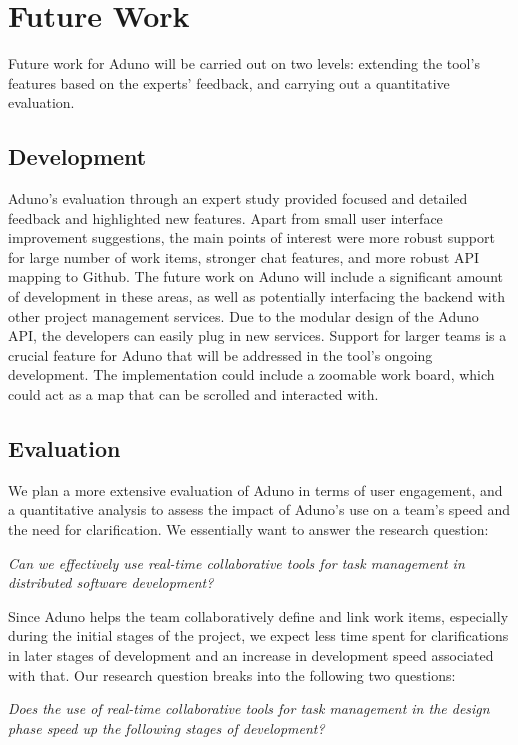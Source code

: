 \documentclass[conference]{IEEEtran}
\begin{document}
\section{Future Work}
\label{sec:future}

Future work for Aduno will be carried out on two levels: extending the tool's features based on the experts' feedback, and carrying out a quantitative evaluation. 
\subsection{Development}
Aduno's evaluation through an expert study provided focused and detailed feedback and highlighted new features.  Apart from small user interface improvement suggestions, the main points of interest were more robust support for large number of work items, stronger chat features, and more robust API mapping to Github. The future work on Aduno will include a significant amount of development in these areas, as well as potentially interfacing the backend with other project management services. Due to the modular design of the Aduno API, the developers can easily plug in new services.  Support for larger teams is a crucial feature for Aduno that will be addressed in the tool's ongoing development.  The implementation could include a zoomable work board, which could act as a map that can be scrolled and interacted with.  

\subsection{Evaluation}
We plan a more extensive evaluation of Aduno in terms of user engagement, and a quantitative analysis to assess the impact of Aduno's use on a team's speed and the need for clarification. We essentially want to answer the research question:

\textit{Can we effectively use real-time collaborative tools for task management in distributed software development?} 

Since Aduno helps the team collaboratively define and link work items, especially during the initial stages of the project, we expect less time spent for clarifications in later stages of development and an increase in development speed associated with that. Our research question breaks into the following two questions:

\textit{Does the use of real-time collaborative tools for task management in the design phase speed up the following stages of development?}
\end{document}

